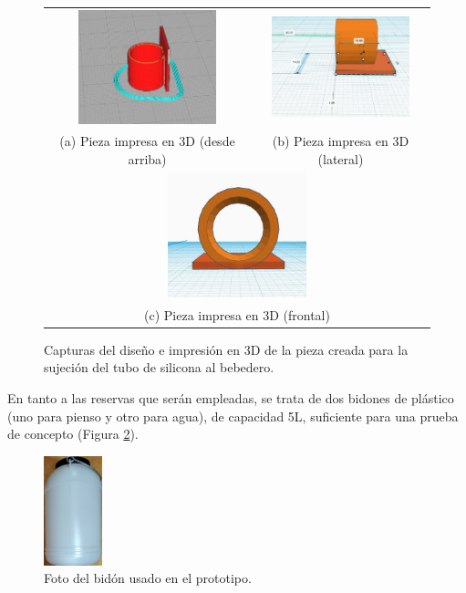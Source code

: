 \documentclass[12pt]{article}
\begin{document}
	\begin{figure}[h]
		\begin{center}
			\begin{tabular}{cc}
				\includegraphics[width=40mm]{img/pieza_sujecion_1.jpg} &   \includegraphics[width=40mm]{img/pieza_sujecion_2.jpg} \\
				(a) Pieza impresa en 3D (desde arriba) & (b) Pieza impresa en 3D (lateral) \\[6pt]
				\multicolumn{2}{c}{\includegraphics[width=40mm]{img/pieza_sujecion_3.jpg} }\\
				\multicolumn{2}{c}{(c) Pieza impresa en 3D (frontal) }
			\end{tabular}
			\caption{Capturas del diseño e impresión en 3D de la pieza creada para la sujeción del tubo de silicona al bebedero. }
			\label{fig: pieza 3D sujecion bebedero}
		\end{center}
	\end{figure}
	
	\noindent En tanto a las reservas que serán empleadas, se trata de dos bidones de plástico (uno para pienso y otro para agua), de capacidad 5L, suficiente para una prueba de concepto (Figura \ref{Captura bidon}). \\
	
	\pagebreak
	
	\begin{figure}[h!]
		\begin{center}
			\includegraphics[width=0.15\textwidth]{img/bidon.png}
			\caption{Foto del bidón usado en el prototipo.}
			\label{Captura bidon}
		\end{center}
	\end{figure}
	
\end{document}
